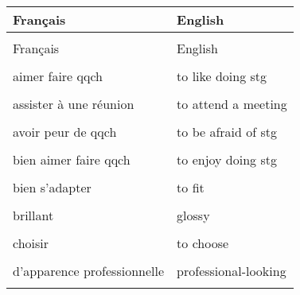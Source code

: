 \documentclass[
  10pt,
]{article}
\begin{document}
\begin{longtable}{ll}
\toprule
Français & \vphantom{1} English\\

\midrule
\cellcolor{gray!6}{ouvert d'esprit} & \cellcolor{gray!6}{open-minded}\\

Français & English\\
\cellcolor{gray!6}{PAO} & \cellcolor{gray!6}{Desktop Publishing (DTP)}\\

aimer faire qqch & to like doing stg\\

\cellcolor{gray!6}{ajouter} & \cellcolor{gray!6}{to add}\\

assister à une réunion & to attend a meeting\\

\cellcolor{gray!6}{attentionné} & \cellcolor{gray!6}{caring}\\

avoir peur de qqch & to be afraid of stg\\

\cellcolor{gray!6}{bavard} & \cellcolor{gray!6}{chatty}\\

bien aimer faire qqch & to enjoy doing stg\\

\cellcolor{gray!6}{bien conçu} & \cellcolor{gray!6}{well-designed}\\

bien s'adapter & to fit\\

\cellcolor{gray!6}{blanchir} & \cellcolor{gray!6}{to bleach}\\

brillant & glossy\\

\cellcolor{gray!6}{carton} & \cellcolor{gray!6}{cardboard (U)}\\

choisir & to choose\\

\cellcolor{gray!6}{commander qqch} & \cellcolor{gray!6}{to order stg}\\

d'apparence professionnelle & professional-looking\\

\cellcolor{gray!6}{de la cire} & \cellcolor{gray!6}{wax (U)}\\


\end{longtable}
\end{document}
